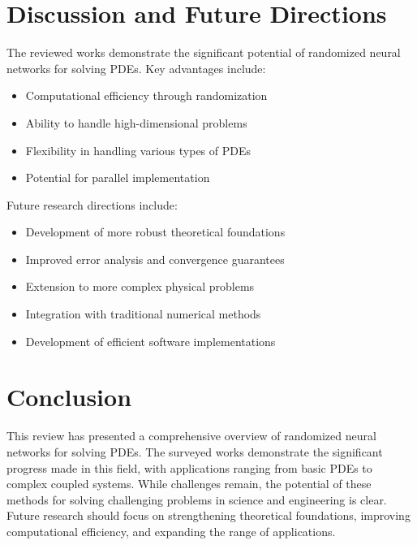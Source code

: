 \documentclass[12pt]{article}
\begin{document}
\section{Discussion and Future Directions}
\label{sec:discussion}
The reviewed works demonstrate the significant potential of randomized neural networks for solving PDEs. Key advantages include:
\begin{itemize}
    \item Computational efficiency through randomization
    \item Ability to handle high-dimensional problems
    \item Flexibility in handling various types of PDEs
    \item Potential for parallel implementation
\end{itemize}

Future research directions include:
\begin{itemize}
    \item Development of more robust theoretical foundations
    \item Improved error analysis and convergence guarantees
    \item Extension to more complex physical problems
    \item Integration with traditional numerical methods
    \item Development of efficient software implementations
\end{itemize}

\section{Conclusion}
\label{sec:conclusion}
This review has presented a comprehensive overview of randomized neural networks for solving PDEs. The surveyed works demonstrate the significant progress made in this field, with applications ranging from basic PDEs to complex coupled systems. While challenges remain, the potential of these methods for solving challenging problems in science and engineering is clear. Future research should focus on strengthening theoretical foundations, improving computational efficiency, and expanding the range of applications.



\end{document}
